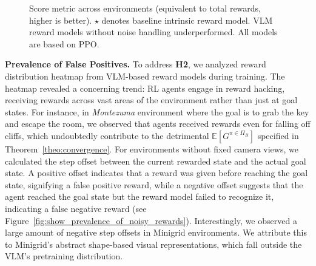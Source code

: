 \documentclass{article}
\theoremstyle{plain}
\theoremstyle{definition}
\theoremstyle{remark}
\begin{document}
\begin{figure}
	\centering
    \caption{Score metric across environments (equivalent to total rewards, higher is better). $\star$ denotes baseline intrinsic reward model. VLM reward models without noise handling underperformed. All models are based on PPO.}
    \label{tab:stage_1_rl_results}
\end{figure}

\noindent\textbf{Prevalence of False Positives.} To address \textbf{H2}, we analyzed reward distribution heatmap from VLM-based reward models during training. The heatmap revealed a concerning trend: RL agents engage in reward hacking, receiving rewards across vast areas of the environment rather than just at goal states. For instance, in \emph{Montezuma} environment where the goal is to grab the key and escape the room, we observed that agents received rewards even for falling off cliffs, which undoubtedly contribute to the detrimental $\mathbb E [G^{\pi \in \Pi_B}]$ specified in Theorem~\ref{theo:convergence}. For environments without fixed camera views, we calculated the step offset between the current rewarded state and the actual goal state. A positive offset indicates that a reward was given before reaching the goal state, signifying a false positive reward, while a negative offset suggests that the agent reached the goal state but the reward model failed to recognize it, indicating a false negative reward (see Figure~\ref{fig:show_prevalence_of_noisy_rewards}). Interestingly, we observed a large amount of negative step offsets in Minigrid environments. We attribute this to Minigrid's abstract shape-based visual representations, which fall outside the VLM's pretraining distribution.
\end{document}
